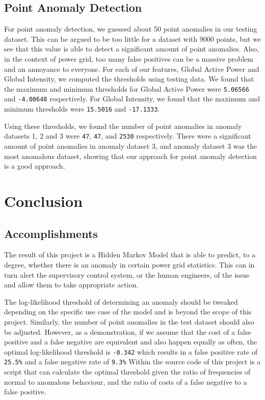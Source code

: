 \documentclass[11pt]{article}
\begin{document}
\subsection{Point Anomaly Detection}
For point anomaly detection, we guessed about 50 point anomalies in our testing 
dataset.
This can be argued to be too little for a dataset with 9000 points, 
but we see that this value is able to detect a significant amount of
point anomalies.
Also, in the context of power grid, too many false positives can be a massive problem 
and an annoyance to everyone.
For each of our features, Global Active Power and Global Intensity, we computed
the thresholds using testing data.
We found that the maximum and minimum thresholds for Global Active Power were \texttt{5.06566} and \texttt{-4.00648} respectively.
For Global Intensity, we found that the maximum and minimum thresholds were \texttt{15.5016} 
and \texttt{-17.1333}. 

Using these thresholds, we found the number of point anomalies in anomaly datasets 1, 
2 and 3 were \texttt{47}, \texttt{47}, and \texttt{2530} respectively.
There were a significant amount of point anomalies in anomaly dataset 3, and anomaly 
dataset 3 was the most anomalous dataset, showing that our approach for point anomaly 
detection is a good approach.

\section{Conclusion}

\subsection{Accomplishments}
The result of this project is a Hidden Markov Model that is able to predict, to a degree, whether
there is an anomaly in certain power grid statistics. This can in turn alert the supervisory
control system, or the human engineers, of the issue and allow them to take appropriate action.

The log-likelihood threshold of determining an anomaly should be tweaked depending on the specific
use case of the model and is beyond the scope of this project.
Similarly, the number of point anomalies in the test dataset should also be adjusted.
However, as a demonstration, if we assume that the cost of a false positive and a false negative
are equivalent and also happen equally as often, the optimal log-likelihood threshold is 
\texttt{-0.342}
which results in a false positive rate of \texttt{25.5\%} and a false negative rate of \texttt{9.3\%}
Within the source code of this project is a script that can calculate the optimal threshold given
the ratio of frequencies of normal to anomalous behaviour, and the ratio of costs of a false
negative to a false positive.
\end{document}
